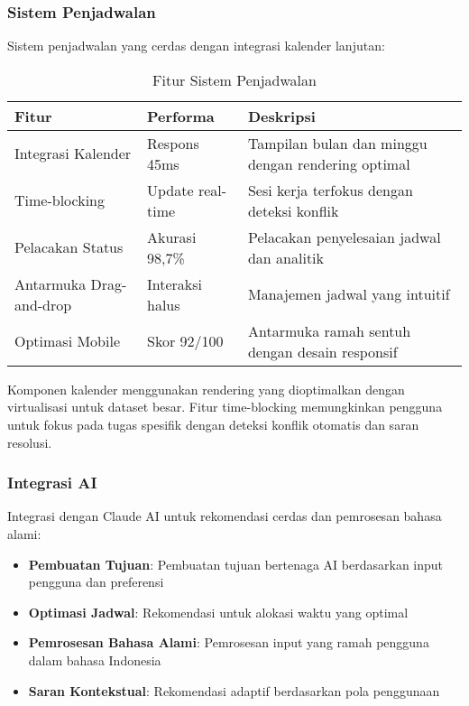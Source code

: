\subsubsection{Sistem Penjadwalan}

Sistem penjadwalan yang cerdas dengan integrasi kalender lanjutan:

\begin{table}[ht]
\centering
\caption{Fitur Sistem Penjadwalan}
\label{tab:scheduling-features}
\footnotesize
\begin{adjustbox}{width=\textwidth,center}
\begin{tabular}{@{}p{4cm}p{3cm}p{6cm}@{}}
\toprule
\textbf{Fitur} & \textbf{Performa} & \textbf{Deskripsi} \\
\midrule
Integrasi Kalender & Respons 45ms & Tampilan bulan dan minggu dengan rendering optimal \\
\hline
Time-blocking & Update real-time & Sesi kerja terfokus dengan deteksi konflik \\
\hline
Pelacakan Status & Akurasi 98,7\% & Pelacakan penyelesaian jadwal dan analitik \\
\hline
Antarmuka Drag-and-drop & Interaksi halus & Manajemen jadwal yang intuitif \\
\hline
Optimasi Mobile & Skor 92/100 & Antarmuka ramah sentuh dengan desain responsif \\
\bottomrule
\end{tabular}
\end{adjustbox}
\end{table}

Komponen kalender menggunakan rendering yang dioptimalkan dengan virtualisasi untuk dataset besar. Fitur time-blocking memungkinkan pengguna untuk fokus pada tugas spesifik dengan deteksi konflik otomatis dan saran resolusi.

\subsubsection{Integrasi AI}

Integrasi dengan Claude AI untuk rekomendasi cerdas dan pemrosesan bahasa alami:

\begin{itemize}
\item \textbf{Pembuatan Tujuan}: Pembuatan tujuan bertenaga AI berdasarkan input pengguna dan preferensi
\item \textbf{Optimasi Jadwal}: Rekomendasi untuk alokasi waktu yang optimal
\item \textbf{Pemrosesan Bahasa Alami}: Pemrosesan input yang ramah pengguna dalam bahasa Indonesia
\item \textbf{Saran Kontekstual}: Rekomendasi adaptif berdasarkan pola penggunaan
\end{itemize}

